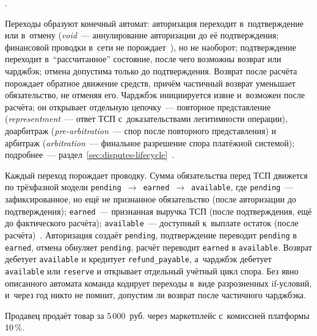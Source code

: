
.

Переходы образуют конечный автомат: авторизация переходит
в~подтверждение или в~отмену (\textit{void}~--- аннулирование
авторизации до её подтверждения; финансовой проводки в~сети
не порождает~\cite{adyen-glossary,stripe-manual-capture}),
но не наоборот; подтверждение переходит в~\enquote{рассчитанное}
состояние, после чего возможны возврат или чарджбэк;
отмена допустима только до подтверждения. Возврат после расчёта
порождает обратное движение
средств, причём частичный возврат уменьшает обязательство,
не отменяя его. Чарджбэк инициируется извне и~возможен после
расчёта; он открывает отдельную цепочку~--- повторное представление
(\textit{representment}~--- ответ ТСП с~доказательствами легитимности
операции), доарбитраж (\textit{pre-arbitration}~--- спор после
повторного представления) и арбитраж (\textit{arbitration}~---
финальное разрешение спора платёжной системой); подробнее~---
раздел~\ref{sec:disputes-lifecycle}~\cite{visa-core-rules,mc-chargeback-guide}.

Каждый переход порождает проводку. Сумма обязательства перед ТСП
движется по трёхфазной модели \texttt{pending}~$\to$~\texttt{earned}~$\to$~\texttt{available},
где \texttt{pending}~--- зафиксированное, но ещё не признанное
обязательство (после авторизации до подтверждения); \texttt{earned}~---
признанная выручка ТСП (после подтверждения, ещё до фактического
расчёта); \texttt{available}~--- доступный к~выплате остаток (после
расчёта)~\cite{stripe-balances,adyen-balances}. Авторизация создаёт
\texttt{pending}, подтверждение переводит \texttt{pending} в
\texttt{earned}, отмена обнуляет \texttt{pending}, расчёт переводит
\texttt{earned} в \texttt{available}. Возврат дебетует
\texttt{available} и кредитует \texttt{refund\_payable},
а~чарджбэк дебетует \texttt{available} или \texttt{reserve} и открывает
отдельный учётный цикл спора. Без явно описанного автомата команда
кодирует переходы в~виде разрозненных if-условий, и~через год никто
не помнит, допустим ли возврат после частичного чарджбэка.

Продавец продаёт товар за 5\,000~руб. через маркетплейс с~комиссией
платформы 10\,\%.

